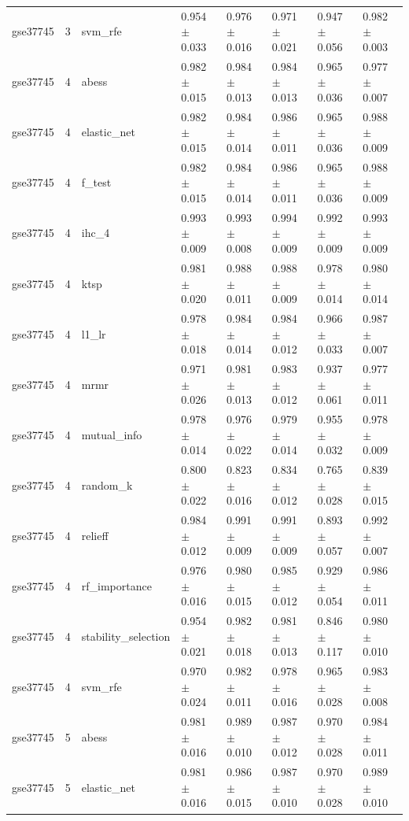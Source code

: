 \begin{table}[t]
\begin{tabular}{llllllll}
    gse37745 & 3 & svm\_rfe & 0.954 $\pm$ 0.033 & 0.976 $\pm$ 0.016 & 0.971 $\pm$ 0.021 & 0.947 $\pm$ 0.056 & 0.982 $\pm$ 0.003 \\
    gse37745 & 4 & abess & 0.982 $\pm$ 0.015 & 0.984 $\pm$ 0.013 & 0.984 $\pm$ 0.013 & 0.965 $\pm$ 0.036 & 0.977 $\pm$ 0.007 \\
    gse37745 & 4 & elastic\_net & 0.982 $\pm$ 0.015 & 0.984 $\pm$ 0.014 & 0.986 $\pm$ 0.011 & 0.965 $\pm$ 0.036 & 0.988 $\pm$ 0.009 \\
    gse37745 & 4 & f\_test & 0.982 $\pm$ 0.015 & 0.984 $\pm$ 0.014 & 0.986 $\pm$ 0.011 & 0.965 $\pm$ 0.036 & 0.988 $\pm$ 0.009 \\
    gse37745 & 4 & ihc\_4 & 0.993 $\pm$ 0.009 & 0.993 $\pm$ 0.008 & 0.994 $\pm$ 0.009 & 0.992 $\pm$ 0.009 & 0.993 $\pm$ 0.009 \\
    gse37745 & 4 & ktsp & 0.981 $\pm$ 0.020 & 0.988 $\pm$ 0.011 & 0.988 $\pm$ 0.009 & 0.978 $\pm$ 0.014 & 0.980 $\pm$ 0.014 \\
    gse37745 & 4 & l1\_lr & 0.978 $\pm$ 0.018 & 0.984 $\pm$ 0.014 & 0.984 $\pm$ 0.012 & 0.966 $\pm$ 0.033 & 0.987 $\pm$ 0.007 \\
    gse37745 & 4 & mrmr & 0.971 $\pm$ 0.026 & 0.981 $\pm$ 0.013 & 0.983 $\pm$ 0.012 & 0.937 $\pm$ 0.061 & 0.977 $\pm$ 0.011 \\
    gse37745 & 4 & mutual\_info & 0.978 $\pm$ 0.014 & 0.976 $\pm$ 0.022 & 0.979 $\pm$ 0.014 & 0.955 $\pm$ 0.032 & 0.978 $\pm$ 0.009 \\
    gse37745 & 4 & random\_k & 0.800 $\pm$ 0.022 & 0.823 $\pm$ 0.016 & 0.834 $\pm$ 0.012 & 0.765 $\pm$ 0.028 & 0.839 $\pm$ 0.015 \\
    gse37745 & 4 & relieff & 0.984 $\pm$ 0.012 & 0.991 $\pm$ 0.009 & 0.991 $\pm$ 0.009 & 0.893 $\pm$ 0.057 & 0.992 $\pm$ 0.007 \\
    gse37745 & 4 & rf\_importance & 0.976 $\pm$ 0.016 & 0.980 $\pm$ 0.015 & 0.985 $\pm$ 0.012 & 0.929 $\pm$ 0.054 & 0.986 $\pm$ 0.011 \\
    gse37745 & 4 & stability\_selection & 0.954 $\pm$ 0.021 & 0.982 $\pm$ 0.018 & 0.981 $\pm$ 0.013 & 0.846 $\pm$ 0.117 & 0.980 $\pm$ 0.010 \\
    gse37745 & 4 & svm\_rfe & 0.970 $\pm$ 0.024 & 0.982 $\pm$ 0.011 & 0.978 $\pm$ 0.016 & 0.965 $\pm$ 0.028 & 0.983 $\pm$ 0.008 \\
    gse37745 & 5 & abess & 0.981 $\pm$ 0.016 & 0.989 $\pm$ 0.010 & 0.987 $\pm$ 0.012 & 0.970 $\pm$ 0.028 & 0.984 $\pm$ 0.011 \\
    gse37745 & 5 & elastic\_net & 0.981 $\pm$ 0.016 & 0.986 $\pm$ 0.015 & 0.987 $\pm$ 0.010 & 0.970 $\pm$ 0.028 & 0.989 $\pm$ 0.010 \\

\end{tabular}
\end{table}

